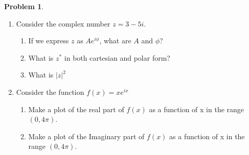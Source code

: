 \documentclass[10pt]{article}
\theoremstyle{definition}
\newtheorem{problem}{Problem}
\begin{document}
\begin{problem}~
\begin{enumerate}[label=(\alph*)]
  \item Consider the complex number $z=3-5i$.
        \begin{enumerate}[label=(\roman*)]
          \item If we express $z$ as $Ae^{i\phi}$, what are $A$ and $\phi$?
          \item What is $z^*$ in both cartesian and polar form?
          \item What is $\left|z\right|^2$
        \end{enumerate}
  \item Consider the function $f(x)=xe^{ix}$
        \begin{enumerate}[label=(\roman*)]
          \item Make a plot of the real part of $f(x)$ as a function of x in the range $(0, 4π)$.
          \item Make a plot of the Imaginary part of $f(x)$ as a function of x in the range $(0, 4π)$.
        \end{enumerate}
\end{enumerate}
\end{problem}
\end{document}
